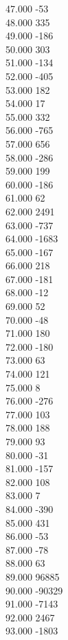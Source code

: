 { 47.000	-53 \\
 48.000	335 \\
 49.000	-186 \\
 50.000	303 \\
 51.000	-134 \\
 52.000	-405 \\
 53.000	182 \\
 54.000	17 \\
 55.000	332 \\
 56.000	-765 \\
 57.000	656 \\
 58.000	-286 \\
 59.000	199 \\
 60.000	-186 \\
 61.000	62 \\
 62.000	2491 \\
 63.000	-737 \\
 64.000	-1683 \\
 65.000	-167 \\
 66.000	218 \\
 67.000	-181 \\
 68.000	-12 \\
 69.000	52 \\
 70.000	-48 \\
 71.000	180 \\
 72.000	-180 \\
 73.000	63 \\
 74.000	121 \\
 75.000	8 \\
 76.000	-276 \\
 77.000	103 \\
 78.000	188 \\
 79.000	93 \\
 80.000	-31 \\
 81.000	-157 \\
 82.000	108 \\
 83.000	7 \\
 84.000	-390 \\
 85.000	431 \\
 86.000	-53 \\
 87.000	-78 \\
 88.000	63 \\
 89.000	96885 \\
 90.000	-90329 \\
 91.000	-7143 \\
 92.000	2467 \\
 93.000	-1803 \\
}
